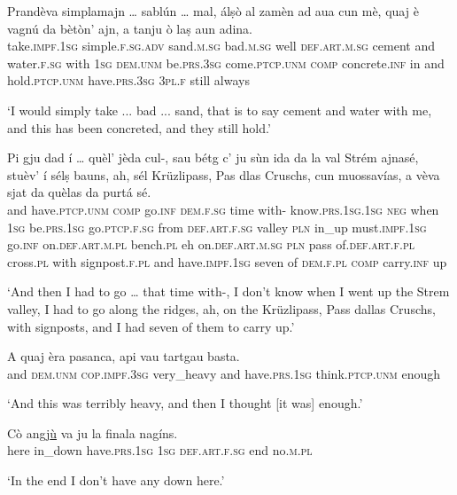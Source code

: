 \begin{linenumbers}
\gll  Prandèva simplamajn … sablún … mal, álṣò al zamèn ad aua cun mè, quaj è vagnú da bètòn’ ajn, a tanju ò laṣ aun adina. \\
 take.\textsc{impf.1sg} simple.\textsc{f.sg.adv} {} sand.\textsc{m.sg} {} bad.\textsc{m.sg} well \textsc{def.art.m.sg} cement and water.\textsc{f.sg} with \textsc{1sg} \textsc{dem.unm} be.\textsc{prs.3sg} come.\textsc{ptcp.unm} \textsc{comp} concrete.\textsc{inf} in and hold.\textsc{ptcp.unm} have.\textsc{prs.3sg} \textsc{3pl.f} still always \\
\end{linenumbers}
\medskip
\glt `I would simply take ... bad ... sand, that is to say cement and water with me, and this has been concreted, and they still hold.'
\medskip

\begin{linenumbers}
\gll  Pi gju dad í … quèl’ jèda cul-, sau bétg c’ ju sùn ida da la val Strém ajnasé, stuèv’ í sélṣ bauns, ah, sél Krüzlipass, Pas dlas Cruschs, cun muossavías, a vèva sjat da quèlas da purtá sé.  \\
and have.\textsc{ptcp.unm} \textsc{comp} go.\textsc{inf} {} \textsc{dem.f.sg} time  with- know.\textsc{prs.1sg.1sg} \textsc{neg} when \textsc{1sg} be.\textsc{prs.1sg} go.\textsc{ptcp.f.sg} from \textsc{def.art.f.sg} valley \textsc{pln} in\_up must.\textsc{impf.1sg} go.\textsc{inf} on.\textsc{def.art.m.pl} bench.\textsc{pl} eh on.\textsc{def.art.m.sg} \textsc{pln} pass of.\textsc{def.art.f.pl} cross.\textsc{pl} with signpost.\textsc{f.pl} and have.\textsc{impf.1sg} seven of  \textsc{dem.f.pl} \textsc{comp} carry.\textsc{inf} up \\
\end{linenumbers}
\medskip
\glt `And then I had to go … that time with-, I don’t know when I went up the Strem valley, I had to go along the ridges, ah, on the Krüzlipass, Pass dallas Cruschs, with signposts, and I had seven of them to carry up.'
\medskip

\begin{linenumbers}
\gll  A quaj èra pasanca, api vau tartgau basta.  \\
and \textsc{dem.unm} \textsc{cop.impf.3sg} very\_heavy and have.\textsc{prs.1sg} think.\textsc{ptcp.unm} enough  \\
\end{linenumbers}
\medskip
\glt `And this was terribly heavy, and then I thought [it was] enough.'
\medskip

\begin{linenumbers}
\gll  Cò angj\underline{ù} va ju la finala nagíns.  \\
here in\_down have.\textsc{prs.1sg} \textsc{1sg} \textsc{def.art.f.sg} end no.\textsc{m.pl}  \\
\end{linenumbers}
\medskip
\glt `In the end I don’t have any down here.'
\medskip

